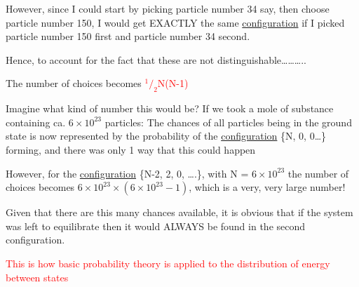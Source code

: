 \documentclass[ignorenonframetext]{beamer}
\begin{document}
\begin{frame}[allowframebreaks=0.7]
However, since I could start by picking particle number 34 say, then choose particle number 150, I would get EXACTLY the same \underline{configuration} if I picked particle number 150 first and particle number 34 second.\par\smallskip
 
Hence, to account for the fact that these are not distinguishable………..\par\smallskip
 
The number of choices becomes \textcolor{red}{\(^1/_2\)N(N-1)}\par\smallskip
 
Imagine what kind of number this would be?\newline\smallskip
If we took a mole of substance containing ca. \(6\times10^{23}\) particles:\newline
The chances of all particles being in the ground state is now represented by the probability of the \underline{configuration}
\{N, 0, 0…\} forming, and there was only 1 way that this could happen\par\smallskip
 
However, for the \underline{configuration} \{N-2, 2, 0, ….\}, with N = \(6\times10^{23}\) the number of choices becomes \(6\times10^{23}\times(6\times10^{23}- 1)\), which is a very, very large number!\par\smallskip
 
Given that there are this many chances available, it is obvious that if the system was left to equilibrate then it would ALWAYS be found in the second configuration.\par
 
\textcolor{red}{This is how basic probability theory is applied to the distribution of energy  between states}
\end{frame}
\end{document}
